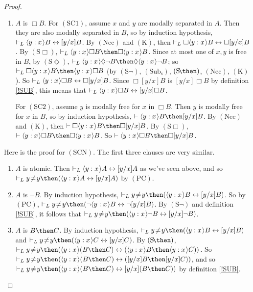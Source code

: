 \documentclass[11pt]{woarticle}
\theoremstyle{break}
\theoremstyle{nonumberplain}
\newcommand{\1}{\;\,|\;\,}
\renewcommand{\t}[1]{\ensuremath{\langle #1  \makebox[.2ex]{}\rangle}}
\newcommand{\T}[1]{\ensuremath{(\mathrm{ #1})}}
\begin{document}
\begin{proof}
\begin{enumerate}
   \item $A$ is $\Box B$.\; For \T{SC1}, assume $x$ and $y$ are
     modally separated in $A$. Then they are also modally separated in
     $B$, so by induction hypothesis, $\vdash_L \t{y:x}B
     \leftrightarrow [y/x]B$. By \T{Nec} and \T{K}, then $\vdash_L
     \Box\t{y:x}B \leftrightarrow \Box[y/x]B$. By \T{S\Box}, $\vdash_L
     \t{y:x}\Box B \then \Box \t{y:x}B$. Since at most one of $x,y$ is
     free in $B$, by \T{S\Diamond}, $\vdash_L \t{y:x}\Diamond \neg B
     \then \Diamond \t{y:x}\neg B$; so $\vdash_L \Box\t{y:x}B \then
     \t{y:x}\Box B$ (by \T{S\neg}, \T{Sub_s}, \T{S\!\then}, \T{Nec},
     \T{K}). So $\vdash_L \t{y:x}\Box B \leftrightarrow
     \Box[y/x]B$. Since $\Box[y/x]B$ is $[y/x]\Box B$ by definition
     \ref{!SUB}, this means that $\vdash_L \t{y:x}\Box B
     \leftrightarrow [y/x]\Box B$.

     For \T{SC2}, assume $y$ is modally free for $x$ in $\Box B$. Then
     $y$ is modally free for $x$ in $B$, so by induction hypothesis,
     $\vdash \t{y:x}B \then [y/x]B$. By \T{Nec} and \T{K}, then
     $\vdash \Box\t{y:x}B \then \Box[y/x]B$. By \T{S\Box}, $\vdash
     \t{y:x}\Box B \then \Box \t{y:x}B$. So $\vdash \t{y:x}\Box B
     \then \Box[y/x]B$. 
   
   \end{enumerate}

   Here is the proof for \T{SCN}. The first three clauses are very
   similar.

   \begin{enumerate}
     
   \item $A$ is atomic.\; Then $\vdash_L \t{y:x}A \leftrightarrow
    [y/x]A$ as we've seen above, and so $\vdash_L y\!\not=\!y \then
    (\t{y:x}A \leftrightarrow [y/x]A)$ by \T{PC}.
    
  \item $A$ is $\neg B$.\; By induction hypothesis, $\vdash_{L}
    y\!\not=\!y \then (\t{y:x}B \leftrightarrow [y/x]B)$. So by
    \T{PC}, $\vdash_L y\!\not=\!y \then (\neg \t{y:x}B \leftrightarrow
    \neg [y/x]B)$. By \T{S\neg} and definition \ref{!SUB}, it follows
    that $\vdash_L y\!\not=\!y \then (\t{y:x} \neg B \leftrightarrow
    [y/x]\neg B)$.
    
  \item $A$ is $B\then C$.\; By induction hypothesis, $\vdash_L
    y\!\not=\!y \then (\t{y:x}B \leftrightarrow [y/x]B)$ and $\vdash_L
    y\!\not=\!y \then (\t{y:x}C \leftrightarrow [y/x]C)$. By
    \T{S\!\then}, $\vdash_L y\!\not=\!y \then (\t{y:x}(B \then C)
    \leftrightarrow (\t{y:x}B \then \t{y:x}C))$. So $\vdash_L
    y\!\not=\!y \then (\t{y:x}(B \then C) \leftrightarrow ([y/x]B
    \then [y/x]C))$, and so $\vdash_L y\!\not=\!y \then (\t{y:x}(B
    \then C) \leftrightarrow [y/x](B \then C))$ by definition
    \ref{!SUB}.


\end{enumerate}
\end{proof}
\end{document}
